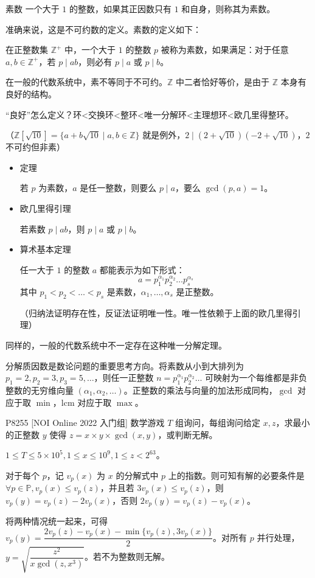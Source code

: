 \documentclass [hyperref={bookmarksdepth=4}, aspectratio=169] {beamer}
\theoremstyle {fy}
\def\Z{\mathbb{Z}}
\begin{document}
\begin{frame}{素数}
一个大于 $1$ 的整数，如果其正因数只有 $1$ 和自身，则称其为素数。

准确来说，这是不可约数的定义。素数的定义如下：

在正整数集 $\Z^{+}$ 中，一个大于 $1$ 的整数 $p$ 被称为素数，如果满足：对于任意 $a,b\in\Z^{+}$，若 $p\mid ab$，则必有 $p\mid a$ 或 $p\mid b$。

在一般的代数系统中，素不等同于不可约。$\Z$ 中二者恰好等价，是由于 $\Z$ 本身有良好的结构。

“良好”怎么定义？环<交换环<整环<唯一分解环<主理想环<欧几里得整环。

（$\Z[\sqrt{10}]=\{a+b\sqrt{10}\mid a,b\in\Z\}$ 就是例外，$2\mid(2+\sqrt{10})(-2+\sqrt{10})$，$2$ 不可约但非素）

\begin{itemize}
    \item 定理

  若 $p$ 为素数，$a$ 是任一整数，则要么 $p\mid a$，要么 $\gcd(p,a)=1$。

    \item 欧几里得引理

  若素数 $p\mid ab$，则 $p\mid a$ 或 $p\mid b$。

    \item 算术基本定理

  任一大于 $1$ 的整数 $a$ 都能表示为如下形式：
  $$
  a=p_1^{\alpha_1}p_2^{\alpha_2}\dots p_s^{\alpha_s}
  $$
  其中 $p_1<p_2<\dots<p_s$ 是素数，$\alpha_1,\dots,\alpha_s$ 是正整数。
  
  （归纳法证明存在性，反证法证明唯一性。唯一性依赖于上面的欧几里得引理）
\end{itemize}

同样的，一般的代数系统中不一定存在这种唯一分解定理。

分解质因数是数论问题的重要思考方向。将素数从小到大排列为 $p_1=2,p_2=3,p_3=5,\dots$，则任一正整数 $n=p_1^{\alpha_1}p_2^{\alpha_2}\dots$ 可映射为一个每维都是非负整数的无穷维向量 $(\alpha_1,\alpha_2,\dots)$。正整数的乘法与向量的加法形成同构，$\gcd$ 对应于取 $\min$，$\mathrm{lcm}$ 对应于取 $\max$。
\end{frame}

\begin{frame}{P8255 [NOI Online 2022 入门组] 数学游戏}
$T$ 组询问，每组询问给定 $x,z$，求最小的正整数 $y$ 使得 $z=x\times y\times \gcd(x,y)$，或判断无解。

$1\le T\le 5\times10^5,1\le x\le 10^9,1\le z<2^{63}$。

对于每个 $p$，记 $v_p(x)$ 为 $x$ 的分解式中 $p$ 上的指数。则可知有解的必要条件是 $\forall p\in \mathbb{P},v_p(x)\le v_p(z)$，并且若 $3v_p(x)\le v_p(z)$，则 $v_p(y)=v_p(z)-2v_p(x)$，否则 $2v_p(y)=v_p(z)-v_p(x)$。

将两种情况统一起来，可得 $v_p(y)=\dfrac{2v_p(z)-v_p(x)-\min\{v_p(z),3v_p(x)\}}{2}$。对所有 $p$ 并行处理，$y=\sqrt{\dfrac{z^2}{x\gcd(z,x^3)}}$。若不为整数则无解。
\end{frame}
\end{document}
